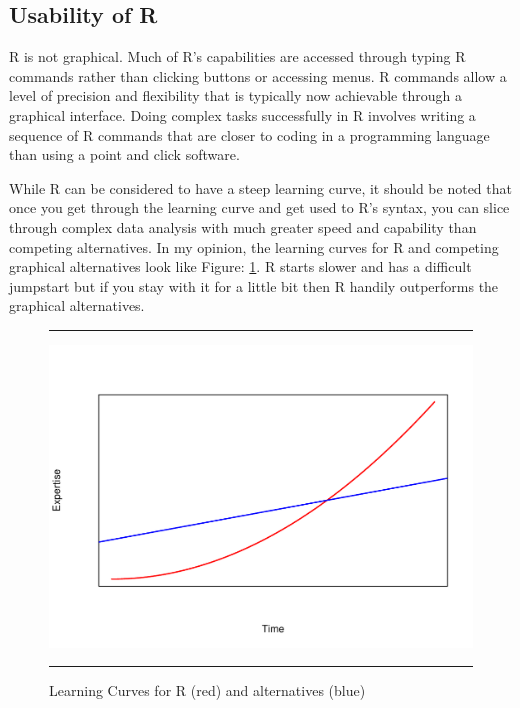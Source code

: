 \documentclass[10pt, letterpaper, twoside]{memoir}\usepackage{knitr}
\begin{document}
\subsection{Usability of R}

R is not graphical. Much of R's capabilities are accessed through typing R commands rather than clicking buttons or accessing menus. R commands allow a level of precision and flexibility that is typically now achievable through a graphical interface. Doing complex tasks successfully in R involves writing a sequence of R commands that are closer to coding in a programming language than using a point and click software.

While R can be considered to have a steep learning curve, it should be noted that once you get through the learning curve and get used to R's syntax, you can slice through complex data analysis with much greater speed and capability than competing alternatives. In my opinion, the learning curves for R and competing graphical alternatives look like Figure: \ref{fig:lcurve}. R starts slower and has a difficult jumpstart but if you stay with it for a little bit then R handily outperforms the graphical alternatives.

\begin{figure}
\centering
\rule{4in}{1pt}
\begin{knitrout}
\color{fgcolor}
\includegraphics[width=\maxwidth]{figure/unnamed-chunk-6-1} 

\end{knitrout}
\caption{Learning Curves for R (red) and alternatives (blue)}
\label{fig:lcurve}
\rule{4in}{1pt}
\end{figure}
\end{document}

